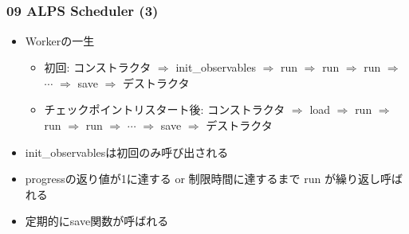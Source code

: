 \subsection*{\redm\whitem\greenb}
\begin{frame}[fragile]
  \frametitle{09 ALPS Scheduler (3)}
  \begin{itemize}
    \item Workerの一生
      \begin{itemize}
        \item 初回: コンストラクタ $\Rightarrow$ {\color{red} init\_observables} $\Rightarrow$ run $\Rightarrow$ run $\Rightarrow$ run  $\Rightarrow$ $\cdots$ $\Rightarrow$ save $\Rightarrow$ デストラクタ
        \item チェックポイントリスタート後: コンストラクタ $\Rightarrow$ {\color{red} load} $\Rightarrow$ run $\Rightarrow$ run $\Rightarrow$ run  $\Rightarrow$ $\cdots$ $\Rightarrow$ save  $\Rightarrow$ デストラクタ
      \end{itemize}
      \item init\_observablesは初回のみ呼び出される
      \item progressの返り値が1に達する or 制限時間に達するまで run が繰り返し呼ばれる
      \item 定期的にsave関数が呼ばれる
  \end{itemize}
\end{frame}


